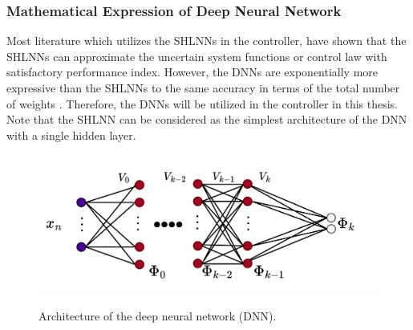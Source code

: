 \subsubsection{Mathematical Expression of Deep Neural Network} \label{chap2:sec:DNN}

Most literature which utilizes the SHLNNs in the controller, have shown that the SHLNNs can approximate the uncertain system functions or control law with satisfactory performance index.
However, the DNNs are exponentially more expressive than the SHLNNs to the same accuracy in terms of the total number of weights \cite{RN65}.
Therefore, the DNNs will be utilized in the controller in this thesis.
Note that the SHLNN can be considered as the simplest architecture of the DNN with a single hidden layer.

\begin{figure}[!t]      
  \centering
  {\includegraphics[width=.85\linewidth]{imgs/NN.drawio.png}}
  \caption{Architecture of the deep neural network (DNN).}
  \label{chap2:fig:DNN}
\end{figure}

